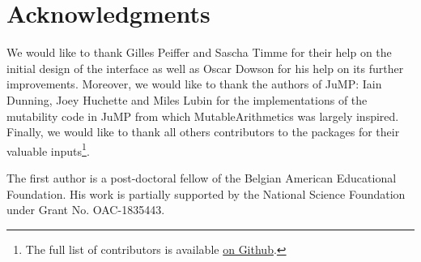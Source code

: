 \documentclass{juliacon}
\begin{document}
\section*{Acknowledgments}

We would like to thank Gilles Peiffer and Sascha Timme for their help on the initial design of the interface as well as Oscar Dowson for his help on its further improvements.
Moreover, we would like to thank the authors of JuMP: Iain Dunning, Joey Huchette and Miles Lubin for the implementations of the mutability code in JuMP from which MutableArithmetics was largely inspired.
Finally, we would like to thank all others contributors to the packages for their valuable inputs\footnote{The full list of contributors is available \href{https://github.com/jump-dev/MutableArithmetics.jl/graphs/contributors}{on Github}.}.

The first author is a post-doctoral fellow of the Belgian American Educational Foundation.
His work is partially supported by the National Science Foundation under Grant No. OAC-1835443.


\end{document}
